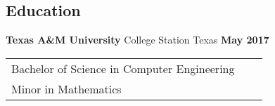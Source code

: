 \documentclass[resmargin,line,12pt]{res}
\newenvironment{list1}{
\begin{list}{\ding{113}}{%
  \setlength{\itemsep}{0in}
  \setlength{\parsep}{0in} \setlength{\parskip}{0in}
  \setlength{\topsep}{0in} \setlength{\partopsep}{0in}
  \setlength{\leftmargin}{0.17in}}}{\end{list}}
\newenvironment{list2}{
\begin{list}{$\bullet$}{%
  \setlength{\itemsep}{0in}
  \setlength{\parsep}{0in} \setlength{\parskip}{0in}
  \setlength{\topsep}{0in} \setlength{\partopsep}{0in}
  \setlength{\leftmargin}{0.2in}}}{\end{list}}
\begin{document}
{\begin{resume}

\color{black}
{\color{Black}
  \vspace{-.1in}
  \section{\sc Education}}

{\bf Texas A\&M University} College Station Texas \hfill {\bf May 2017} \ \\
\vspace*{-.17in}
\begin{tabular}{l l l}
  Bachelor of Science in Computer Engineering \\
  Minor in Mathematics \\
\end{tabular}




\end{resume}}
\end{document}
